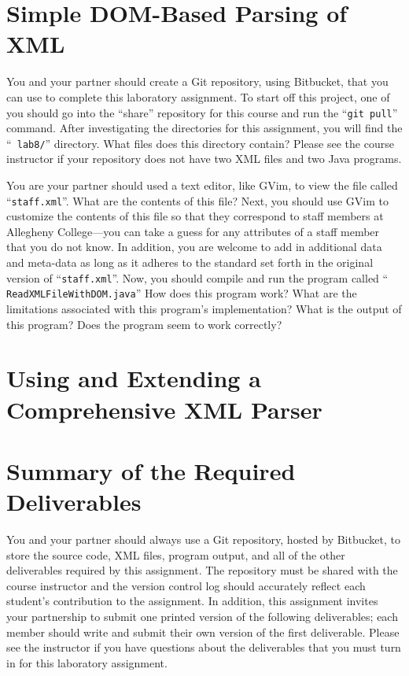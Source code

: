 \section*{Simple DOM-Based Parsing of XML}

You and your partner should create a Git repository, using Bitbucket, that you can use to complete this laboratory
assignment.  To start off this project, one of you should go into the ``share'' repository for this course and run the
``{\tt git pull}'' command. After investigating the directories for this assignment, you will find the ``{\tt
  lab8/}'' directory. What files does this directory contain?  Please see the course instructor if your repository does
not have two XML files and two Java programs.

You are your partner should used a text editor, like GVim, to view the file called ``{\tt staff.xml}''.  What are the
contents of this file?  Next, you should use GVim to customize the contents of this file so that they correspond to
staff members at Allegheny College---you can take a guess for any attributes of a staff member that you do not know.  In
addition, you are welcome to add in additional data and meta-data as long as it adheres to the standard set forth in the
original version of ``{\tt staff.xml}''. Now, you should compile and run the program called ``{\tt
  ReadXMLFileWithDOM.java}'' How does this program work? What are the limitations associated with this program's
implementation? What is the output of this program? Does the program seem to work correctly?

\vspace*{-.05in}
\section*{Using and Extending a Comprehensive XML Parser}



\section*{Summary of the Required Deliverables}

You and your partner should always use a Git repository, hosted by Bitbucket, to store the source code, XML files,
program output, and all of the other deliverables required by this assignment. The repository must be shared with the
course instructor and the version control log should accurately reflect each student's contribution to the assignment.
In addition, this assignment invites your partnership to submit one printed version of the following deliverables; each
member should write and submit their own version of the first deliverable. Please see the instructor if you have
questions about the deliverables that you must turn in for this laboratory assignment.

